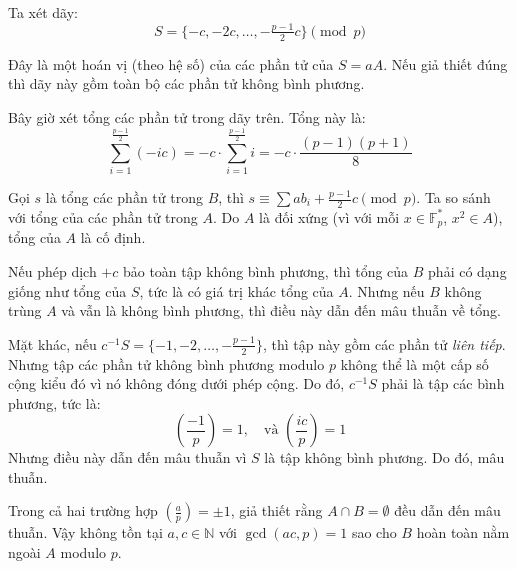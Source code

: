\documentclass[../08-quadratic-residues.tex]{subfiles}
\begin{document}
\begin{soln}
	Ta xét dãy:
	\[
		S = \{-c, -2c, \dots, -\tfrac{p-1}{2}c\} \pmod{p}
	\]
	
	Đây là một hoán vị (theo hệ số) của các phần tử của \( S = aA \). Nếu giả thiết đúng thì dãy này gồm toàn bộ các phần tử không bình phương.
	
	Bây giờ xét tổng các phần tử trong dãy trên. Tổng này là:
	\[
		\sum_{i=1}^{\frac{p-1}{2}} (-ic) = -c \cdot \sum_{i=1}^{\frac{p-1}{2}} i = -c \cdot \frac{(p-1)(p+1)}{8}
	\]
	
	Gọi \( s \) là tổng các phần tử trong \( B \), thì \( s \equiv \sum ab_i + \frac{p-1}{2}c \pmod{p} \).
	Ta so sánh với tổng của các phần tử trong \( A \). Do \( A \) là đối xứng (vì với mỗi \( x \in \mathbb{F}_p^* \), \( x^2 \in A \)), tổng của \( A \) là cố định.
	
	Nếu phép dịch \( +c \) bảo toàn tập không bình phương, thì tổng của \( B \) phải có dạng giống như tổng của \( S \), tức là có giá trị khác tổng của \( A \).
	Nhưng nếu \( B \) không trùng \( A \) và vẫn là không bình phương, thì điều này dẫn đến mâu thuẫn về tổng.
	
	Mặt khác, nếu \( c^{-1}S = \{-1, -2, \dots, -\frac{p-1}{2} \} \), thì tập này gồm các phần tử \textit{liên tiếp}.
	Nhưng tập các phần tử không bình phương modulo \( p \) không thể là một cấp số cộng kiểu đó vì nó không đóng dưới phép cộng.
	Do đó, \( c^{-1}S \) phải là tập các bình phương, tức là:
	\[
		\left( \frac{-1}{p} \right) = 1, \quad \text{và } \left( \frac{ic}{p} \right) = 1
	\]
	Nhưng điều này dẫn đến mâu thuẫn vì \( S \) là tập không bình phương. Do đó, mâu thuẫn.

	Trong cả hai trường hợp \( \left( \frac{a}{p} \right) = \pm 1 \), giả thiết rằng \( A \cap B = \emptyset \) đều dẫn đến mâu thuẫn.
	Vậy không tồn tại \( a, c \in \mathbb{N} \) với \( \gcd(ac, p) = 1 \) sao cho \( B \) hoàn toàn nằm ngoài \( A \) modulo \( p \).
\end{soln}

\end{document}
